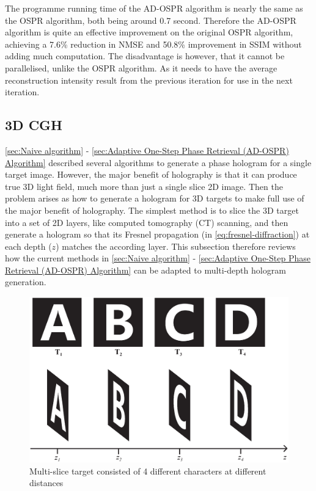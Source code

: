 The programme running time of the AD-OSPR algorithm is nearly the same as the OSPR algorithm, both being around 0.7 second. Therefore the AD-OSPR algorithm is quite an effective improvement on the original OSPR algorithm, achieving a 7.6\% reduction in NMSE and 50.8\% improvement in SSIM without adding much computation. The disadvantage is however, that it cannot be parallelised, unlike the OSPR algorithm. As it needs to have the average reconstruction intensity result from the previous iteration for use in the next iteration.


\newpage
\subsection{3D CGH}
\cref{sec:Naive algorithm} - \cref{sec:Adaptive One-Step Phase Retrieval (AD-OSPR) Algorithm} described several algorithms to generate a phase hologram for a single target image. However, the major benefit of holography is that it can produce true 3D light field, much more than just a single slice 2D image. Then the problem arises as how to generate a hologram for 3D targets to make full use of the major benefit of holography. The simplest method is to slice the 3D target into a set of 2D layers, like computed tomography (CT) scanning, and then generate a hologram so that its Fresnel propagation (in \cref{eq:fresnel-diffraction}) at each depth ($z$) matches the according layer. This subsection therefore reviews how the current methods in \cref{sec:Naive algorithm} - \cref{sec:Adaptive One-Step Phase Retrieval (AD-OSPR) Algorithm} can be adapted to multi-depth hologram generation.

\begin{figure}[H]
	\centering
	\includegraphics[width=1.0\textwidth]{ABCD/ABCD_target.eps}
	\caption{Multi-slice target consisted of 4 different characters at different distances}
	\label{fig:ABCD_target}
\end{figure}

